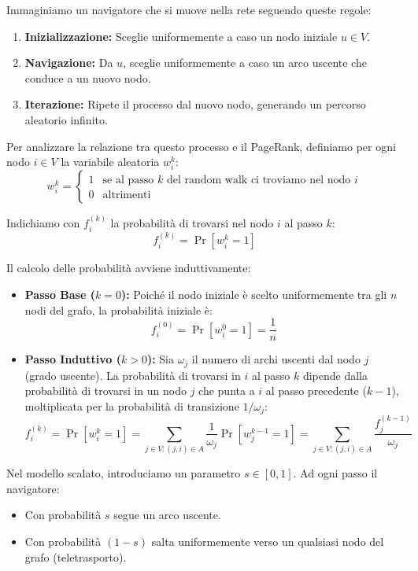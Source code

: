 Immaginiamo un navigatore che si muove nella rete seguendo queste regole:
\begin{enumerate}
    \item \textbf{Inizializzazione:} Sceglie uniformemente a caso un nodo iniziale $u \in V$.
    \item \textbf{Navigazione:} Da $u$, sceglie uniformemente a caso un arco uscente che conduce a un nuovo nodo.
    \item \textbf{Iterazione:} Ripete il processo dal nuovo nodo, generando un percorso aleatorio infinito.
\end{enumerate}

Per analizzare la relazione tra questo processo e il PageRank, definiamo per ogni nodo $i \in V$ la variabile aleatoria $w_i^k$:
\[
w_i^k = 
\begin{cases} 
1 & \text{se al passo } k \text{ del random walk ci troviamo nel nodo } i \\
0 & \text{altrimenti}
\end{cases}
\]

Indichiamo con $f_i^{(k)}$ la probabilità di trovarsi nel nodo $i$ al passo $k$:
\[ f_i^{(k)} = \Pr\left[w_i^k = 1\right] \]

Il calcolo delle probabilità avviene induttivamente:

\begin{itemize}
    \item \textbf{Passo Base ($k=0$):} Poiché il nodo iniziale è scelto uniformemente tra gli $n$ nodi del grafo, la probabilità iniziale è:
    \[
    f_i^{(0)} = \Pr \left[w_i^0 = 1\right] = \frac{1}{n}
    \]
    
    \item \textbf{Passo Induttivo ($k > 0$):} Sia $\omega_j$ il numero di archi uscenti dal nodo $j$ (grado uscente). La probabilità di trovarsi in $i$ al passo $k$ dipende dalla probabilità di trovarsi in un nodo $j$ che punta a $i$ al passo precedente ($k-1$), moltiplicata per la probabilità di transizione $1/\omega_j$:
    \[
    f_i^{(k)} = \Pr\left[w_i^k = 1\right] = \sum_{j \in V : (j,i) \in A} \frac{1}{\omega_j} \Pr\left[w_j^{k-1} = 1\right] = \sum_{j \in V : (j,i) \in A} \frac{f_j^{(k-1)}}{\omega_j}
    \]
\end{itemize}

Nel modello scalato, introduciamo un parametro $s \in [0,1]$. Ad ogni passo il navigatore:
\begin{itemize}
    \item Con probabilità $s$ segue un arco uscente.
    \item Con probabilità $(1-s)$ salta uniformemente verso un qualsiasi nodo del grafo (teletrasporto).
\end{itemize}

